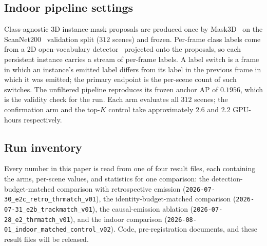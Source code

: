 \subsection{Indoor pipeline settings}
\label{sec:supp-indoor}

Class-agnostic 3D instance-mask proposals are produced once by
Mask3D~\cite{mask3d} on the ScanNet200~\cite{scannet200} validation split
($312$ scenes) and frozen. Per-frame class labels come from a 2D
open-vocabulary detector~\cite{yoloworld} projected onto the proposals, so each
persistent instance carries a stream of per-frame labels. A label switch is a
frame in which an instance's emitted label differs from its label in the
previous frame in which it was emitted; the primary endpoint is the per-scene
count of such switches. The unfiltered pipeline reproduces its frozen anchor AP
of $0.1956$, which is the validity check for the run. Each arm evaluates all
$312$ scenes; the confirmation arm and the top-$K$ control take approximately
$2.6$ and $2.2$ GPU-hours respectively.

\subsection{Run inventory}
\label{sec:supp-runs}

Every number in this paper is read from one of four result files, each
containing the arms, per-scene values, and statistics for one comparison:
the detection-budget-matched comparison with retrospective emission
(\texttt{2026-07-30\_e2c\_retro\_thrmatch\_v01}), the identity-budget-matched
comparison (\texttt{2026-07-31\_e2b\_trackmatch\_v01}), the causal-emission
ablation (\texttt{2026-07-28\_e2\_thrmatch\_v01}), and the indoor comparison
(\texttt{2026-08-01\_indoor\_matched\_control\_v02}). Code, pre-registration
documents, and these result files will be released.
